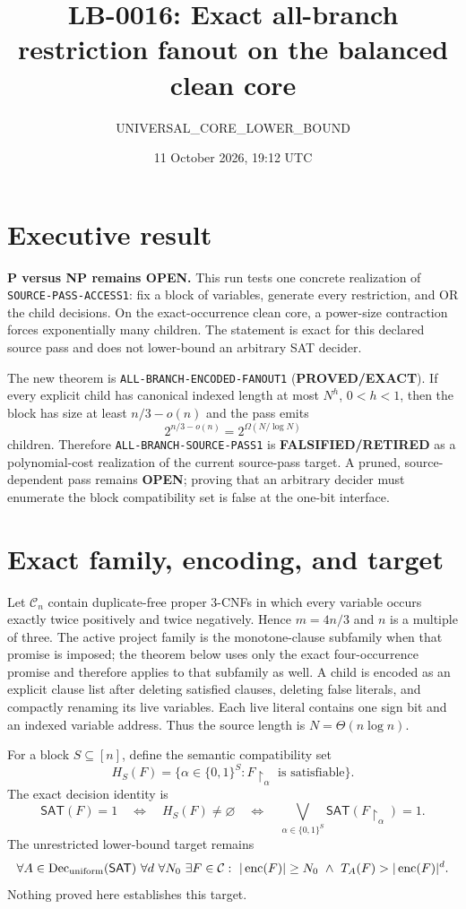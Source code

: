 \documentclass[11pt]{article}
\title{LB-0016: Exact all-branch restriction fanout on the balanced clean core}
\author{UNIVERSAL\_CORE\_LOWER\_BOUND}
\date{11 October 2026, 19:12 UTC}
\newcommand{\SAT}{\mathsf{SAT}}
\newcommand{\OPEN}{\textbf{OPEN}}
\newcommand{\EXACT}{\textbf{PROVED/EXACT}}
\newcommand{\RETIRED}{\textbf{FALSIFIED/RETIRED}}
\begin{document}
\maketitle

\section*{Executive result}

\textbf{P versus NP remains OPEN.}  This run tests one concrete realization
of \texttt{SOURCE-PASS-ACCESS1}: fix a block of variables, generate every
restriction, and OR the child decisions.  On the exact-occurrence clean core,
a power-size contraction forces exponentially many children.  The statement
is exact for this declared source pass and does not lower-bound an arbitrary
SAT decider.

The new theorem is \texttt{ALL-BRANCH-ENCODED-FANOUT1} (\EXACT).  If every
explicit child has canonical indexed length at most $N^h$, $0<h<1$, then the
block has size at least $n/3-o(n)$ and the pass emits
\[
  2^{n/3-o(n)}=2^{\Omega(N/\log N)}
\]
children.  Therefore \texttt{ALL-BRANCH-SOURCE-PASS1} is \RETIRED{} as a
polynomial-cost realization of the current source-pass target.  A pruned,
source-dependent pass remains \OPEN; proving that an arbitrary decider must
enumerate the block compatibility set is false at the one-bit interface.

\section{Exact family, encoding, and target}

Let $\mathcal C_n$ contain duplicate-free proper $3$-CNFs in which every
variable occurs exactly twice positively and twice negatively.  Hence
$m=4n/3$ and $n$ is a multiple of three.  The active project family is the
monotone-clause subfamily when that promise is imposed; the theorem below
uses only the exact four-occurrence promise and therefore applies to that
subfamily as well.  A child is encoded as an explicit clause list after
deleting satisfied clauses, deleting false literals, and compactly renaming
its live variables.  Each live literal contains one sign bit and an indexed
variable address.  Thus the source length is $N=\Theta(n\log n)$.

For a block $S\subseteq[n]$, define the semantic compatibility set
\[
 H_S(F)=\{\alpha\in\{0,1\}^{S}:F\!\upharpoonright_\alpha
 \text{ is satisfiable}\}.
\]
The exact decision identity is
\[
 \SAT(F)=1\quad\Longleftrightarrow\quad H_S(F)\ne\varnothing
 \quad\Longleftrightarrow\quad
 \bigvee_{\alpha\in\{0,1\}^{S}}
 \SAT(F\!\upharpoonright_\alpha)=1.
\]
The unrestricted lower-bound target remains
\[
 \forall A\in\operatorname{Dec}_{\rm uniform}(\SAT)\ \forall d\ \forall N_0\
 \exists F\in\mathcal C:\ |\operatorname{enc}(F)|\ge N_0
 \ \wedge\ T_A(F)>|\operatorname{enc}(F)|^d .
\]
Nothing proved here establishes this target.
\end{document}
